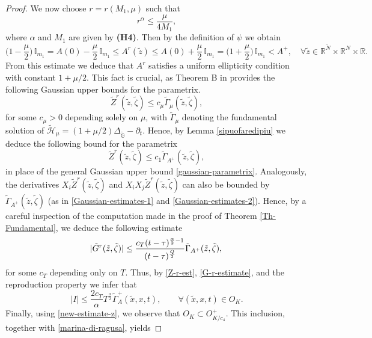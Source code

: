 \documentclass[11pt,a4paper]{article}
\numberwithin{equation}{section}
\newcommand{\R}{\mathbb{R}}
\def \rn {{\mathbb {R}}^{N}}
\def \rnm {{\mathbb {R}}^{\tilde N}}
\def \tt {\tilde}
\def \GG {{\mathbb{G}}}
\def \p {\partial}
\def \ti {\times}
\def \a {{\alpha}}
\def \G {{\Gamma}}
\def \t {{\tau}}
\def \m {{\mu}}
\def \z {{\zeta}}
\begin{document}
{{\begin{proof}
	
	We now choose $r=r(M_1,\mu)$ such that
	\begin{equation}
		r^\a\leq \frac{\mu}{4 M_1},
	\end{equation} 
	where $\a$ and $M_1$ are given by \textbf{(H4)}. Then by the definition of $\psi$ we obtain 
	\begin{equation}
		 \Big(1-\frac{\mu}{2}\Big) \, \mathbb{I}_{m_1}=A(0) - \frac{\mu}{2} \, \mathbb{I}_{m_1}\leq A^r(\tt z)\leq A(0) + \frac{\mu}{2} \, \mathbb{I}_{m_1}= \Big(1+\frac{\mu}{2}\Big) \, \mathbb{I}_{m_1}<A^+, \quad \forall \tt z \in \rnm\ti \rn\ti\R.
	\end{equation}
	From this estimate we deduce that $A^r$ satisfies a uniform ellipticity condition with constant $1+\mu/2$. This fact is crucial, as Theorem B in \cite{bonfiglioli2002uniform} provides the following Gaussian upper bounds for the parametrix.
	\begin{equation}
		\tt Z^r(\tt z,\tt \z)\leq  c_\mu \tt\G_{\mu}(\tt z,\tt \z),
	\end{equation}
	for some $c_\mu>0$ depending solely on $\mu$, with $\tt\G_{\mu}$ denoting the fundamental solution of $\tt{\mathscr{H}}_{\mu}=(1+\m/2)\Delta_{\tt\GG}-\p_t$. Hence, by Lemma \ref{sipuofaredipiu} we deduce the following bound for the parametrix 
	\begin{equation}\label{Z-r-est}
		\tt Z^r(\tt z,\tt \z)\leq c_1 \tt\G_{A^+}(\tt z,\tt \z),
	\end{equation}
	in place of the general Gaussian upper bound \eqref{gaussian-parametrix}. Analogously, the derivatives $X_i \tt Z^r(\tt z,\tt \z)$ and $X_i X_j\tt Z^r(\tt z,\tt \z)$ can also be bounded by $\tt\G_{A^+}(\tt z,\tt \z)$ (as in \eqref{Gaussian-estimates-1} and \eqref{Gaussian-estimates-2}). Hence, by a careful inspection of the computation made in the proof of Theorem \ref{Th-Fundamental}, we deduce the following estimate 
	\begin{equation}\label{G-r-estimate}
		|\tt G^r(\tt z,\tt \z)|\leq \frac{c_T (t-\tau)^{\frac{\a}{2}-1}}{(t-\t)^{\frac{Q}{2}}}\tt\G_{A^+}(\tt z,\tt \z),\\
	\end{equation}
	for some $c_T$ depending only on $T$. Thus, by \eqref{Z-r-est}, \eqref{G-r-estimate}, and the reproduction property we infer that
	\begin{equation}
		|I|\leq \frac{2 c_T}{\a} T^\frac{\a}{2}\tt\G_A^{+}(\tilde x,x,t),\qquad \forall (\tt x,x, t)\in O_K.
	\end{equation}
	Finally, using \eqref{new-estimate-z}, we observe that $O_K \subset O^+_{K/c_4}$. This inclusion, together with \eqref{marina-di-ragusa}, yields

\end{proof}}}
\end{document}
